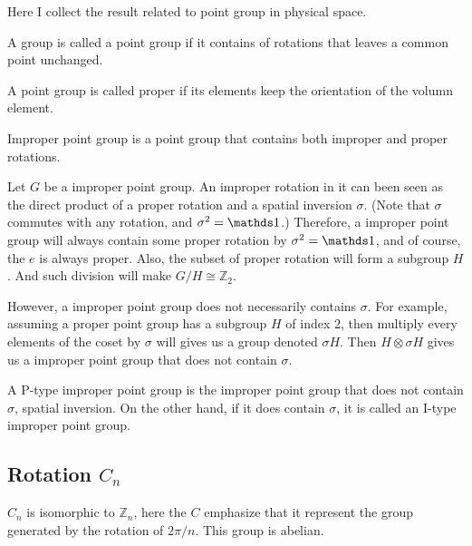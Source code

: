 Here I collect the result related to point group in physical space.
\begin{defi}
    A group is called a point group if it contains of rotations
    that leaves a common point unchanged.
\end{defi}
\begin{defi}
    A point group is called proper if its elements keep the orientation of the
    volumn element.
\end{defi}
\begin{defi}
    Improper point group is a point group that contains both improper
    and proper rotations.
\end{defi}
\begin{defi}
    
\end{defi}
\begin{remark}
    Let $G$ be a improper point group.
    An improper rotation in it can been seen as the direct product of a
    proper rotation and a spatial inversion $\sigma$. (Note that
    $\sigma$ commutes with any rotation, and $\sigma^2=\id$.)
    Therefore, a improper point group will always contain some proper
    rotation by $\sigma^2=\id$, and of course, the $e$ is always
    proper. Also, the subset of proper rotation will form a subgroup
    $H$. And such division will make $G/H \cong \mathbb{Z}_2$.
\end{remark}
However, a improper point group does not necessarily contains
$\sigma$. For example, assuming a proper point group has a subgroup
$H$ of index $2$, then multiply every elements of the coset by
$\sigma$ will gives us a group denoted $\sigma H$. Then $H\otimes
\sigma H$ gives us a improper point group that does not contain
$\sigma$.

\begin{defi}
    A P-type improper point group is the improper point group that
    does not contain $\sigma$, spatial inversion. On the other hand,
    if it does contain $\sigma$, it is called an I-type improper point
    group.
\end{defi}

\subsection{Rotation \texorpdfstring{$C_n$}{}}
\label{sec:C_n}
$C_n$ is isomorphic to $\mathbb{Z}_n$, here the $C$ emphasize that it
represent the group generated by the rotation of $2\pi/n$. This group
is abelian.

